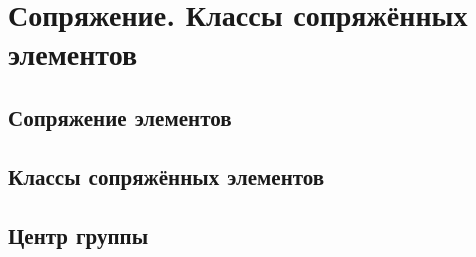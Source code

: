 \section{Сопряжение. Классы сопряжённых элементов}
\subsection{Сопряжение элементов}

\subsection{Классы сопряжённых элементов}
\subsection{Центр группы}
